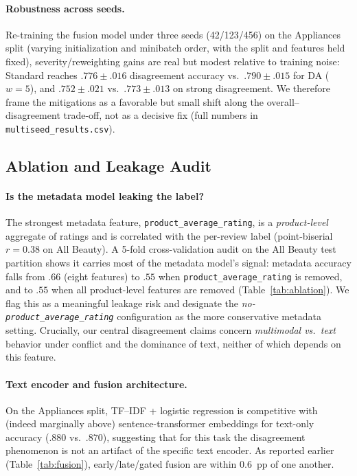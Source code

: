 \documentclass[11pt,a4paper]{article}
\begin{document}
\paragraph{Robustness across seeds.}
Re-training the fusion model under three seeds (42/123/456) on the Appliances split (varying initialization and minibatch order, with the split and features held fixed), severity/reweighting gains are real but modest relative to training noise: Standard reaches $.776\pm.016$ disagreement accuracy vs.\ $.790\pm.015$ for DA ($w{=}5$), and $.752\pm.021$ vs.\ $.773\pm.013$ on strong disagreement.
We therefore frame the mitigations as a favorable but small shift along the overall--disagreement trade-off, not as a decisive fix (full numbers in \texttt{multiseed\_results.csv}).

\subsection{Ablation and Leakage Audit}

\paragraph{Is the metadata model leaking the label?}
The strongest metadata feature, \texttt{product\_average\_rating}, is a \emph{product-level} aggregate of ratings and is correlated with the per-review label (point-biserial $r = 0.38$ on All Beauty).
A 5-fold cross-validation audit on the All Beauty test partition shows it carries most of the metadata model's signal: metadata accuracy falls from $.66$ (eight features) to $.55$ when \texttt{product\_average\_rating} is removed, and to $.55$ when all product-level features are removed (Table~\ref{tab:ablation}).
We flag this as a meaningful leakage risk and designate the \emph{no-\texttt{product\_average\_rating}} configuration as the more conservative metadata setting.
Crucially, our central disagreement claims concern \emph{multimodal vs.\ text} behavior under conflict and the dominance of text, neither of which depends on this feature.

\paragraph{Text encoder and fusion architecture.}
On the Appliances split, TF--IDF + logistic regression is competitive with (indeed marginally above) sentence-transformer embeddings for text-only accuracy ($.880$ vs.\ $.870$), suggesting that for this task the disagreement phenomenon is not an artifact of the specific text encoder.
As reported earlier (Table~\ref{tab:fusion}), early/late/gated fusion are within $0.6$~pp of one another.
\end{document}
